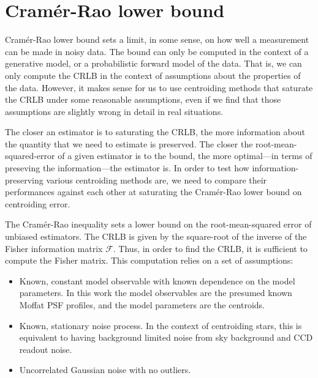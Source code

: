 \documentclass[12pt, preprint]{aastex}
\begin{document}

\section{Cram\'{e}r-Rao lower bound}\label{sec:CRLB}

Cram\'{e}r-Rao lower bound sets a limit, in some sense, on how well a measurement 
can be made in noisy data.  The bound can only be computed in the context of a 
generative model, or a probabilistic forward model of the data. That is, we can 
only compute the CRLB in the context of assumptions about the properties of the data. 
However, it makes sense for us to use centroiding methods that saturate the CRLB under 
some reasonable assumptions, even if we find that those assumptions are slightly wrong 
in detail in real situations.

The closer an estimator is to saturating the CRLB, the more information about the quantity that we 
need to estimate is preserved. The closer the root-mean-squared-error of a given estimator is to the bound,  
the more optimal---in terms of preseving the information---the estimator is. In order to test how information-preserving 
various centroiding methods are, we need to compare their 
performances against each other at saturating the Cram\'{e}r-Rao lower bound 
on centroiding error. 

The Cram\'{e}r-Rao inequality \citep{cramer} sets a lower bound on the 
root-mean-squared error of unbiased estimators. The CRLB is given by the square-root of the inverse of 
the Fisher information matrix $\mathcal{F}$. Thus, in order to find the CRLB, it is sufficient to compute the Fisher matrix. 
This computation relies on a set of assumptions:

\begin{itemize}
  \item Known, constant model observable with known dependence on the model parameters. 
        In this work the model observables are the presumed known Moffat PSF profiles, 
        and the model parameters are the centroids. 
  \item Known, stationary noise process. In the context of centroiding stars, this is equivalent to 
        having background limited noise from sky background and CCD readout noise.
  \item Uncorrelated Gaussian noise with no outliers. 
\end{itemize}
 
\end{document}
